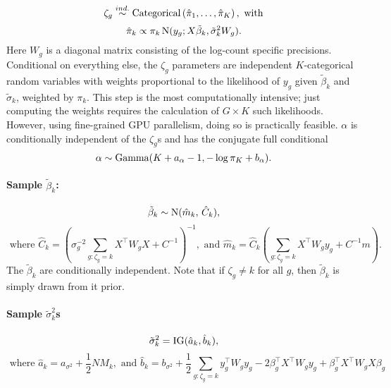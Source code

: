 \begin{equation*}
\zeta_g \stackrel{ind.}{\sim} \operatorname{Categorical}\left(\hat{\pi}_1,\ldots,\hat{\pi}_K \right), \mbox{ with}
\end{equation*}
\begin{equation*}
\hat{\pi}_k \propto \pi_k \operatorname{N}(y_g;X\tilde{\beta}_k,\tilde{\sigma}_k^2 W_g).
\end{equation*}
Here $W_g$ is a diagonal matrix consisting of the log-count specific precisions. Conditional on everything else, the $\zeta_g$ parameters are independent $K$-categorical random variables with weights proportional to the likelihood of $y_g$ given $\tilde{\beta}_k$ and $\tilde{\sigma}_k$, weighted by $\pi_k$. This step is the most computationally intensive; just computing the weights requires the calculation of $G\times K$ such likelihoods. However, using fine-grained GPU parallelism, doing so is practically feasible. $\alpha$ is conditionally independent of the $\zeta_g$s and has the conjugate full conditional
\begin{equation*}
\alpha \sim \operatorname{Gamma}(K + a_\alpha - 1, -\log \pi_K + b_\alpha).
\end{equation*}


\paragraph{Sample $\tilde{\beta}_k$:}
\begin{equation*}
\tilde{\beta}_k \sim \operatorname{N}(\hat{m}_k,\, \hat{C}_k),
\end{equation*}
\begin{equation*}
\mbox{ where }\hat{C}_k= \left( \sigma^{-2}_g\sum_{g:\zeta_g=k}
  X^\top W_g X + C^{-1} \right)^{-1}, \mbox{ and }\hat{m}_k=\hat{C}_k \left(\sum_{g:\zeta_g=k} X^\top W_g y_g +
      C^{-1}m \right).
\end{equation*}
The $\tilde{\beta}_k$ are conditionally independent. Note that if $\zeta_g \neq k$ for all $g$, then $\tilde{\beta}_k$ is simply drawn from it prior.

\paragraph{Sample $\tilde{\sigma}_k^2$s}
\begin{equation*}
      \tilde{\sigma}_k^2 = \operatorname{IG}(\hat{a}_k,\hat{b}_k),
    \end{equation*}
    \begin{equation*}
      \mbox{ where }\hat{a}_k = a_{\sigma^2} + \frac{1}{2}NM_k,\mbox{ and }\hat{b}_k= b_{\sigma^2} + \frac{1}{2}\sum_{g:\zeta_g=k}y_g^\top W_g y_g -2 \beta_g^\top X^\top W_g y_g  +\beta_g^\top X^\top W_g X \beta_g
    \end{equation*}

